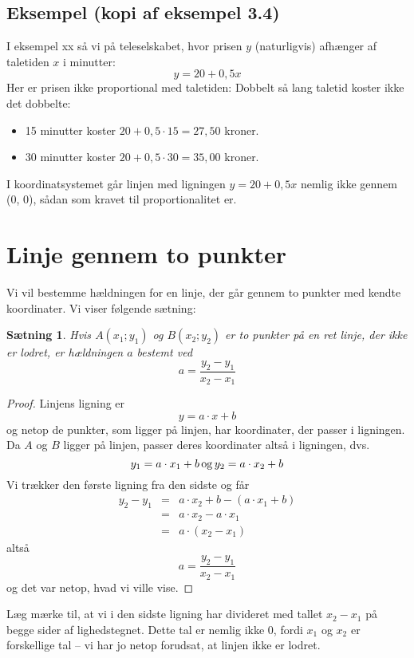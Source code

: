 \documentclass[12pt,oneside,a4paper]{article}
\newcommand{\bas}{\begin{eqnarray*}}
\newcommand{\eas}{\end{eqnarray*}}
\newtheorem{thm}{Sætning}[section]
\begin{document}
\subsection{Eksempel (kopi af eksempel 3.4)}
I eksempel xx så vi på teleselskabet, hvor prisen $y$ (naturligvis) afhænger af
taletiden $x$ i minutter:
$$
y=20+0,5x
$$
Her er prisen ikke proportional med taletiden: Dobbelt så lang taletid koster ikke
det dobbelte:
\begin{itemize}
    \item 15 minutter koster $20+0,5\cdot 15 = 27,50$ kroner.
    \item 30 minutter koster $20+0,5\cdot 30 = 35,00$ kroner.
\end{itemize}
I koordinatsystemet går linjen med ligningen $y=20+0,5x$ nemlig ikke gennem (0, 0),
sådan som kravet til proportionalitet er.

\section{Linje gennem to punkter}
Vi vil bestemme hældningen for en linje, der går gennem
to punkter med kendte koordinater. Vi viser følgende sætning:
\begin{thm}
    Hvis $A(x_1; y_1)$ og $B(x_2; y_2)$ er to punkter på en ret linje, der ikke
    er lodret, er hældningen $a$ bestemt ved
    $$
    a = \frac{y_2-y_1}{x_2-x_1}
    $$
\end{thm}
\begin{proof}
    Linjens ligning er 
    $$
    y = a\cdot x + b
    $$
    og netop de punkter, som ligger på linjen, har koordinater, der passer i
    ligningen.  Da $A$ og $B$ ligger på linjen, passer deres koordinater altså
    i ligningen, dvs.
    $$
    y_1 = a\cdot x_1 + b \, {\rm og} \, y_2 = a\cdot x_2 + b 
    $$
    Vi trækker den første ligning fra den sidste og får
    \bas
    y_2 - y_1 &=& a\cdot x_2 + b - (a\cdot x_1 + b) \\
              &=& a\cdot x_2 - a\cdot x_1 \\
              &=& a\cdot \left(x_2-x_1\right) 
    \eas
    altså
    $$
    a = \frac{y_2-y_1}{x_2-x_1}
    $$
    og det var netop, hvad vi ville vise.
\end{proof}

Læg mærke til, at vi i den sidste ligning har divideret med tallet $x_2-x_1$ på
begge sider af lighedstegnet. Dette tal er nemlig ikke $0$, fordi $x_1$ og
$x_2$ er forskellige tal -- vi har jo netop forudsat, at linjen ikke er lodret.
\end{document}
